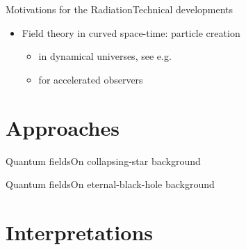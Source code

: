 \documentclass{beamer}
\begin{document}
\begin{frame}{Motivations for the Radiation}{Technical developments}

\begin{itemize}
\item Field theory in curved space-time: particle creation
	\begin{itemize}
	\item in dynamical universes, see e.g.\ \cite{parker2009quantum}
	\item for accelerated observers \cite{Unruh1976,Davies1975,Fulling1973}
	\end{itemize}
\end{itemize}

\end{frame}


\section{Approaches}

\begin{frame}{Quantum fields}{On collapsing-star background}
\cite{HAWKING1974,Hawking1975}
\end{frame}

\begin{frame}{Quantum fields}{On eternal-black-hole background}
\cite{Candelas1980,Frolov1998}
\end{frame}






\section{Interpretations}
\end{document}
